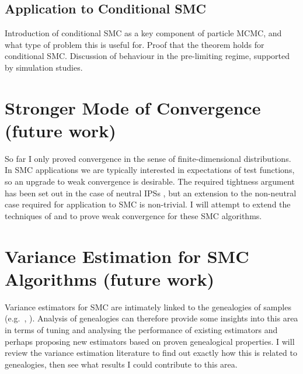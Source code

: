 \documentclass{article}
\begin{document}
\subsection{Application to Conditional SMC}
Introduction of conditional SMC as a key component of particle MCMC, and what type of problem this is useful for. Proof that the theorem holds for conditional SMC. Discussion of behaviour in the pre-limiting regime, supported by simulation studies.

\section{Stronger Mode of Convergence (future work)}
So far I only proved convergence in the sense of finite-dimensional distributions. In SMC applications we are typically interested in expectations of test functions, so an upgrade to weak convergence is desirable. The required tightness argument has been set out in the case of neutral IPSs \citep{mohle1999}, but an extension to the non-neutral case required for application to SMC is non-trivial. I will attempt to extend the techniques of \citet{mohle1999} and \citet{gerber2017} to prove weak convergence for these SMC algorithms.

\section{Variance Estimation for SMC Algorithms (future work)}
Variance estimators for SMC are intimately linked to the genealogies of samples (e.g.\ \citet{chan2013}, \citet{olsson2019}). Analysis of genealogies can therefore provide some insights into this area in terms of tuning and analysing the performance of existing estimators and perhaps proposing new estimators based on proven genealogical properties. I will review the variance estimation literature to find out exactly how this is related to genealogies, then see what results I could contribute to this area.


\end{document}
